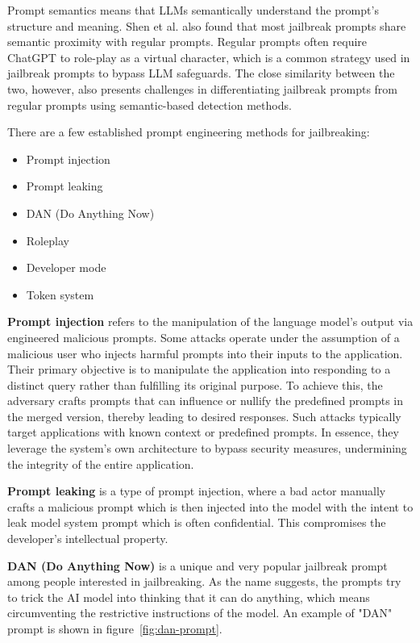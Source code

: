 Prompt semantics means that LLMs semantically understand the prompt's structure and meaning. Shen et al.\cite{shen2024donowcharacterizingevaluating} also found that most jailbreak prompts share semantic proximity with regular prompts. Regular prompts often require ChatGPT to role-play as a virtual character, which is a common strategy used in jailbreak prompts to bypass LLM safeguards. The close similarity between the two, however, also presents challenges in differentiating jailbreak prompts from regular prompts using semantic-based detection methods.



There are a few established prompt engineering methods for jailbreaking:
\begin{itemize}
    \item Prompt injection
    \item Prompt leaking
    \item DAN (Do Anything Now)
    \item Roleplay
    \item Developer mode
    \item Token system
\end{itemize}

\textbf{Prompt injection} refers to the manipulation of the language model's output via engineered malicious prompts. Some attacks operate under the assumption of a malicious user who injects harmful prompts into their inputs to the application. Their primary objective is to manipulate the application into responding to a distinct query rather than fulfilling its original purpose. To achieve this, the adversary crafts prompts that can influence or nullify the predefined prompts in the merged version, thereby leading to desired responses. Such attacks typically target applications with known context or predefined prompts. In essence, they leverage the system's own architecture to bypass security measures, undermining the integrity of the entire application\cite{liu2024promptinjectionattackllmintegrated}.

\textbf{Prompt leaking} is a type of prompt injection, where a bad actor manually crafts a malicious prompt which is then injected into the model with the intent to leak model system prompt which is often confidential. This compromises the developer’s intellectual property.

\textbf{DAN (Do Anything Now)} is a unique and very popular jailbreak prompt among people interested in jailbreaking. As the name suggests, the prompts try to trick the AI model into thinking that it can do anything, which means circumventing the restrictive instructions of the model. An example of "DAN" prompt is shown in figure~\ref{fig:dan-prompt}.

